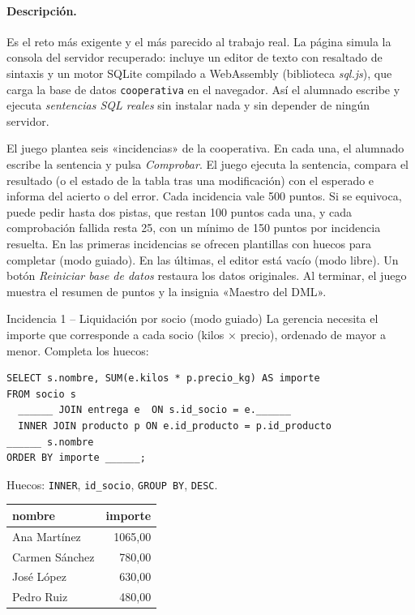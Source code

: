 \documentclass[11pt,a4paper]{article}
\begin{document}
\paragraph{Descripción.} Es el reto más exigente y el más parecido al trabajo real.
La página simula la consola del servidor recuperado: incluye un editor de texto con resaltado
de sintaxis y un motor SQLite compilado a WebAssembly (biblioteca \emph{sql.js}), que carga la
base de datos \texttt{cooperativa} en el navegador. Así el alumnado escribe y ejecuta
\emph{sentencias SQL reales} sin instalar nada y sin depender de ningún servidor.

El juego plantea seis «incidencias» de la cooperativa. En cada una, el alumnado escribe la
sentencia y pulsa \emph{Comprobar}. El juego ejecuta la sentencia, compara el resultado
(o el estado de la tabla tras una modificación) con el esperado e informa del acierto o del
error. Cada incidencia vale 500 puntos. Si se equivoca, puede pedir hasta dos pistas, que restan 100 puntos cada una, y cada comprobación fallida resta 25, con un mínimo de 150 puntos por incidencia resuelta. En las primeras incidencias
se ofrecen plantillas con huecos para completar (modo guiado). En las últimas, el editor está
vacío (modo libre). Un botón \emph{Reiniciar base de datos} restaura los datos originales.
Al terminar, el juego muestra el resumen de puntos y la insignia «Maestro del DML».

\begin{reto}{Incidencia 1 -- Liquidación por socio (modo guiado)}
La gerencia necesita el importe que corresponde a cada socio (kilos $\times$ precio),
ordenado de mayor a menor. Completa los huecos:
\begin{lstlisting}
SELECT s.nombre, SUM(e.kilos * p.precio_kg) AS importe
FROM socio s
  ______ JOIN entrega e  ON s.id_socio = e.______
  INNER JOIN producto p ON e.id_producto = p.id_producto
______ s.nombre
ORDER BY importe ______;
\end{lstlisting}
\end{reto}
\begin{solucion}
Huecos: \texttt{INNER}, \texttt{id\_socio}, \texttt{GROUP BY}, \texttt{DESC}.

\begin{tabular}{@{}lr@{}}
\toprule
\textbf{nombre} & \textbf{importe} \\
\midrule
Ana Martínez   & 1065,00 \\
Carmen Sánchez &  780,00 \\
José López     &  630,00 \\
Pedro Ruiz     &  480,00 \\
\bottomrule
\end{tabular}
\end{solucion}
\end{document}
